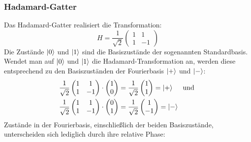 \subsubsection*{Hadamard-Gatter}
Das Hadamard-Gatter realisiert die Transformation:
\[
  H 
  =
  \frac{1}{\sqrt{2}}
  \begin{pmatrix}
    1 & 1 \\
    1 & -1
    \end{pmatrix}
\]
Die Zustände \(\ket{0}\) und \(\ket{1}\) sind die Basiszustände der sogenannten Standardbasis.
Wendet man auf \(\ket{0}\) und \(\ket{1}\) die Hadamard-Transformation an, 
werden diese entsprechend zu den Basiszuständen der Fourierbasis \(\ket{+}\) und \(\ket{-}\):
\begin{align*} 
  &\frac{1}{\sqrt{2}}
\begin{pmatrix}
  1 & 1 \\
  1 & -1
  \end{pmatrix}
  \cdot
  \begin{pmatrix}
    1 \\
    0
  \end{pmatrix}
  =
  \frac{1}{\sqrt{2}}
  \begin{pmatrix}
    1 \\
    1
  \end{pmatrix}
  =
  \ket{+}
  \quad\text{ und } \\
  &\frac{1}{\sqrt{2}}
  \begin{pmatrix}
    1 & 1 \\
    1 & -1
    \end{pmatrix}
    \cdot
    \begin{pmatrix}
      0 \\
      1
    \end{pmatrix}
    =
    \frac{1}{\sqrt{2}}
    \begin{pmatrix}
      1 \\
      -1
    \end{pmatrix}
    =
    \ket{-}
  \end{align*}
  Zustände in der Fourierbasis, einschließlich der beiden Basiszustände, unterscheiden sich lediglich durch ihre relative Phase:
